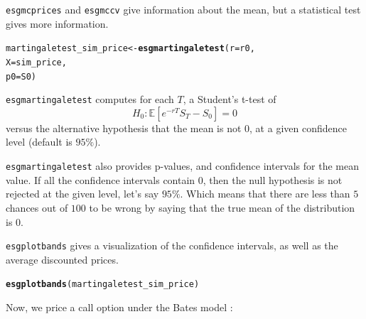 \documentclass[a4paper]{article}\usepackage[]{graphicx}\usepackage[]{color}
\makeatletter
\newcommand{\hlstd}[1]{\textcolor[rgb]{0.345,0.345,0.345}{#1}}%
\newcommand{\hlkwb}[1]{\textcolor[rgb]{0.69,0.353,0.396}{#1}}%
\newcommand{\hlkwc}[1]{\textcolor[rgb]{0.333,0.667,0.333}{#1}}%
\newcommand{\hlkwd}[1]{\textcolor[rgb]{0.737,0.353,0.396}{\textbf{#1}}}%
\newenvironment{kframe}{%
 \def\at@end@of@kframe{}%
 \ifinner\ifhmode%
  \def\at@end@of@kframe{\end{minipage}}%
  \begin{minipage}{\columnwidth}%
 \fi\fi%
 \def\FrameCommand##1{\hskip\@totalleftmargin \hskip-\fboxsep
 \colorbox{shadecolor}{##1}\hskip-\fboxsep
     \hskip-\linewidth \hskip-\@totalleftmargin \hskip\columnwidth}%
 \MakeFramed {\advance\hsize-\width
   \@totalleftmargin\z@ \linewidth\hsize
   \@setminipage}}%
 {\par\unskip\endMakeFramed%
 \at@end@of@kframe}
\newenvironment{knitrout}{}{} %
\newcommand{\EE}{\ensuremath{\mathbb{E}} }
\newcommand{\code}[1]{\mbox{\texttt{#1}}}
\makeatother
\begin{document}
\code{esgmcprices} and \code{esgmccv} give information about the mean, but a statistical test gives more information.  

\begin{knitrout}
\color{fgcolor}\begin{kframe}
\begin{alltt}
\hlstd{martingaletest_sim_price} \hlkwb{<-} \hlkwd{esgmartingaletest}\hlstd{(}\hlkwc{r} \hlstd{= r0,}
                                              \hlkwc{X} \hlstd{= sim_price,}
                                              \hlkwc{p0} \hlstd{= S0)}
\end{alltt}


{\ttfamily\noindent\bfseries\color{errorcolor}{\#\# Error in deltat(X): object 'sim\_price' not found}}\end{kframe}
\end{knitrout}

\code{esgmartingaletest} computes for each $T$, a Student's t-test of 
$$H_0 : \EE[e^{-rT}S_T - S_0] = 0$$
versus the alternative hypothesis that the mean is not $0$, at a given confidence level (default is $95\%$).

\medskip

\code{esgmartingaletest} also provides p-values, and confidence intervals for the mean value. If all the confidence intervals contain $0$, then the null hypothesis is not rejected at the given level, let's say $95\%$. Which means that there are less than $5$ chances out of $100$ to be wrong by saying that the true mean of the distribution is $0$. 

\medskip
\code{esgplotbands} gives a visualization of the confidence intervals, as well as the average discounted prices. 

\begin{knitrout}
\color{fgcolor}\begin{kframe}
\begin{alltt}
\hlkwd{esgplotbands}\hlstd{(martingaletest_sim_price)}
\end{alltt}


{\ttfamily\noindent\bfseries\color{errorcolor}{\#\# Error in is.ts(x): object 'martingaletest\_sim\_price' not found}}\end{kframe}
\end{knitrout}

Now, we price a call option under the Bates model :
\end{document}
